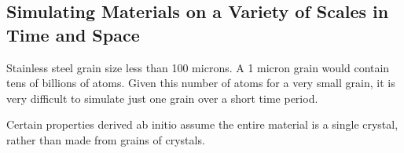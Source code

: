 \FloatBarrier
\subsection{Simulating Materials on a Variety of Scales in Time and Space}

Stainless steel grain size less than 100 microns.  A 1 micron grain would contain tens of billions of atoms.  Given this number of atoms for a very small grain, it is very difficult to simulate just one grain over a short time period.

Certain properties derived ab initio assume the entire material is a single crystal, rather than made from grains of crystals.  





































